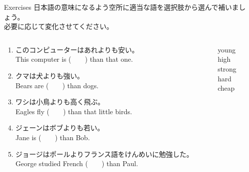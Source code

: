 \documentclass[aspectratio=169,xcolor={dvipsnames,table}]{beamer}
\begin{document}
\begin{frame}[plain]{Exercises}
日本語の意味になるよう空所に適当な語を選択肢から選んで補いましょう。\\必要に応じて変化させてください。

\begin{columns}[t]
 \begin{column}{.78\textwidth}
   \begin{enumerate}
  \item このコンピューターはあれよりも安い。\\
	This computer is (~~~~) than that one. 
    \item クマは犬よりも強い。\\
	Bears are (~~~~) than dogs. 
    \item ワシは小鳥よりも高く飛ぶ。\\
	Eagles fly (~~~~) than that little birds. 
    \item ジェーンはボブよりも若い。\\
	Jane is (~~~~) than Bob. 
    \item ジョージはポールよりフランス語をけんめいに勉強した。\\
	George studied French (~~~~) than Paul. 
 \end{enumerate}
 \end{column}
\begin{column}{.2\textwidth}
 \begin{tcolorbox}
  young\\
  high\\
  strong\\
  hard\\
  cheap
 \end{tcolorbox}
\end{column}
\end{columns}
\end{frame}
\end{document}
